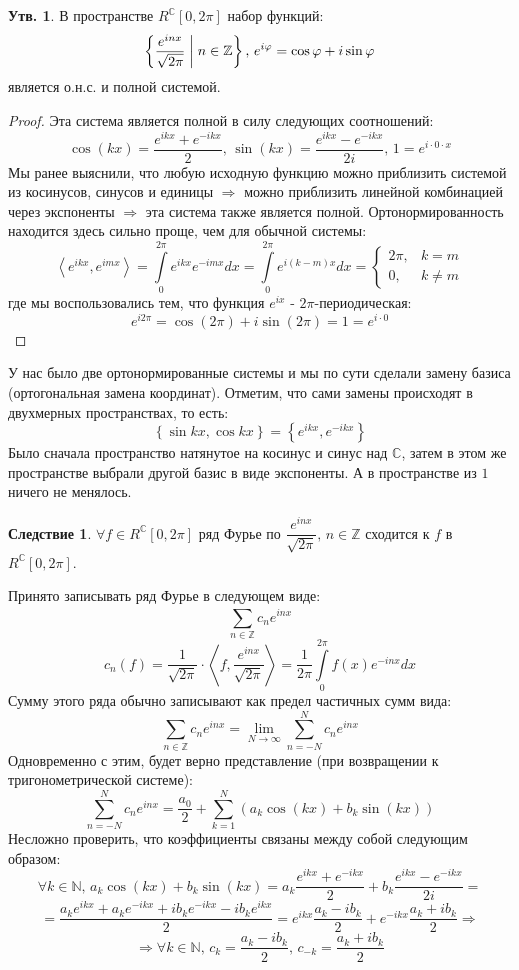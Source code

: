 \documentclass[12pt]{article}
\newcommand{\MC}{\mathbb{C}}
\newcommand{\MN}{\mathbb{N}}
\newcommand{\MZ}{\mathbb{Z}}
\theoremstyle{definition}
\newtheorem{prop}{Утв.}
\newtheorem{corollary}{Следствие}
\newcommand{\ddsum}[2]{\displaystyle\sum\limits_{#1}^{#2}}
\newcommand{\ddint}[2]{\displaystyle\int\limits_{#1}^{#2}}
\newcommand{\inner}[2]{\left\langle #1, #2 \right\rangle }
\begin{document}
\begin{prop}
	В пространстве $R^{\MC}[0,2\pi]$ набор функций:
	$$
		\left\{ \dfrac{e^{inx}}{\sqrt{2\pi}} \biggm\vert  n \in \MZ \right\}, \, e^{i\varphi} = \cos{\varphi} + i \sin{\varphi}
	$$
	является о.н.с. и полной системой.
\end{prop}
\begin{proof}
	Эта система является полной в силу следующих соотношений:
	$$
		\cos{(kx)} = \dfrac{e^{ikx} + e^{-ikx}}{2}, \, \sin{(kx)} = \dfrac{e^{ikx} - e^{-ikx}}{2i}, \, 1 = e^{i{\cdot}0{\cdot}x}
	$$
	Мы ранее выяснили, что любую исходную функцию можно приблизить системой из косинусов, синусов и единицы $\Rightarrow$ можно приблизить линейной комбинацией через экспоненты $\Rightarrow$ эта система также является полной. Ортонормированность находится здесь сильно проще, чем для обычной системы:
	$$
		\inner{e^{ikx}}{e^{imx}} = \ddint{0}{2\pi}e^{ikx}e^{-imx}dx = \ddint{0}{2\pi}e^{i(k-m)x}dx = \left\{
		\begin{array}{rl}
			2\pi, & k = m \\
			0, & k \neq m
		\end{array}
		\right.
	$$
	где мы воспользовались тем, что функция $e^{ix}$ - $2\pi$-периодическая: 
	$$
		e^{i2\pi} = \cos{(2\pi)} + i\sin{(2\pi)} = 1 = e^{i{\cdot}0}
	$$
\end{proof}
У нас было две ортонормированные системы и мы по сути сделали замену базиса (ортогональная замена координат). Отметим, что сами замены происходят в двухмерных пространствах, то есть:
$$
	\left\{\sin{kx},\cos{kx}\right\} = \left\{e^{ikx},e^{-ikx}\right\}
$$
Было сначала пространство натянутое на косинус и синус над $\MC$, затем в этом же пространстве выбрали другой базис в виде экспоненты. А в пространстве из $1$ ничего не менялось.
\newpage
\begin{corollary}
	$\forall f \in R^{\MC}[0,2\pi]$ ряд Фурье по $\dfrac{e^{inx}}{\sqrt{2\pi}}, \, n \in \MZ$ сходится к $f$ в $R^{\MC}[0,2\pi]$. 
\end{corollary}
Принято записывать ряд Фурье в следующем виде:
$$
	\ddsum{n \in \MZ}{}c_ne^{inx} 
$$	
$$
	c_n(f) = \dfrac{1}{\sqrt{2\pi}}{\cdot}\inner{f}{\dfrac{e^{inx}}{\sqrt{2\pi}}} =  \dfrac{1}{2\pi}\ddint{0}{2\pi}f(x)e^{-inx}dx
$$
Сумму этого ряда обычно записывают как предел частичных сумм вида:
$$
	\ddsum{n \in \MZ}{}c_ne^{inx}  = \lim\limits_{N\to \infty}\ddsum{n = -N}{N}c_n e^{inx}
$$
Одновременно с этим, будет верно представление (при возвращении к тригонометрической системе):
$$
	\ddsum{n = -N}{N}c_n e^{inx} = \dfrac{a_0}{2} + \ddsum{k = 1}{N}\left(a_k \cos{(kx)} + b_k \sin{(kx)}\right)
$$
Несложно проверить, что коэффициенты связаны между собой следующим образом:
$$
	\forall k \in \MN,\,  a_k \cos{(kx)} + b_k \sin{(kx)} = a_k\dfrac{e^{ikx} + e^{-ikx}}{2} + b_k\dfrac{e^{ikx} - e^{-ikx}}{2i} = 
$$
$$
	= \dfrac{a_ke^{ikx} + a_k e^{-ikx} + ib_ke^{-ikx} - ib_ke^{ikx} }{2} = e^{ikx}\dfrac{a_k -ib_k}{2} + e^{-ikx}\dfrac{a_k + ib_k}{2} \Rightarrow
$$
$$
	\Rightarrow \forall k \in \MN, \, c_k = \dfrac{a_k -ib_k}{2}, \, c_{-k} = \dfrac{a_k + ib_k}{2}
$$
\end{document}
